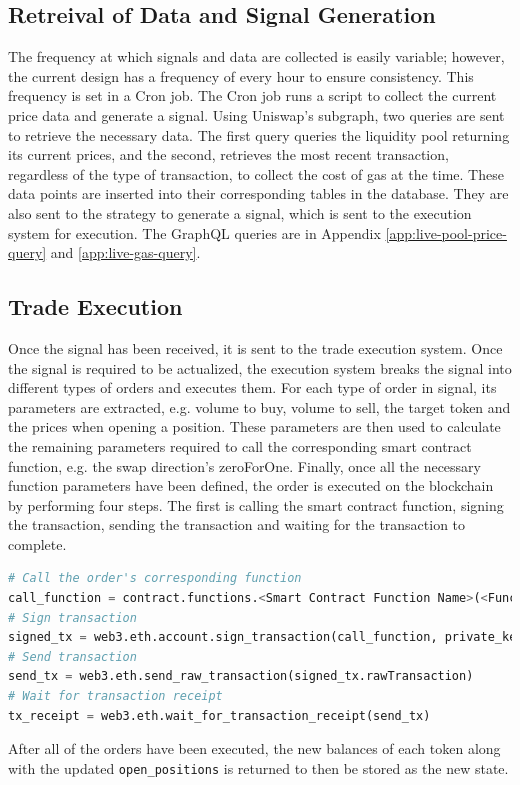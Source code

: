 \subsection{Retreival of Data and Signal Generation}
The frequency at which signals and data are collected is easily variable; however, the current design has a frequency of every hour to ensure consistency. This frequency is set in a Cron job. The Cron job runs a script to collect the current price data and generate a signal. Using Uniswap's subgraph, two queries are sent to retrieve the necessary data. The first query queries the liquidity pool returning its current prices, and the second, retrieves the most recent transaction, regardless of the type of transaction, to collect the cost of gas at the time. These data points are inserted into their corresponding tables in the database. They are also sent to the strategy to generate a signal, which is sent to the execution system for execution. The GraphQL queries are in Appendix \ref{app:live-pool-price-query} and \ref{app:live-gas-query}.

\subsection{Trade Execution}
Once the signal has been received, it is sent to the trade execution system. Once the signal is required to be actualized, the execution system breaks the signal into different types of orders and executes them. For each type of order in signal, its parameters are extracted, e.g. volume to buy, volume to sell, the target token and the prices when opening a position. These parameters are then used to calculate the remaining parameters required to call the corresponding smart contract function, e.g. the swap direction's zeroForOne. Finally, once all the necessary function parameters have been defined, the order is executed on the blockchain by performing four steps. The first is calling the smart contract function, signing the transaction, sending the transaction and waiting for the transaction to complete.
\begin{lstlisting}[language=Python]
# Call the order's corresponding function
call_function = contract.functions.<Smart Contract Function Name>(<Function Paramters>).buildTransaction({"chainId": Chain_id, "from": caller, "nonce": nonce})
# Sign transaction
signed_tx = web3.eth.account.sign_transaction(call_function, private_key=private_key)
# Send transaction
send_tx = web3.eth.send_raw_transaction(signed_tx.rawTransaction)
# Wait for transaction receipt
tx_receipt = web3.eth.wait_for_transaction_receipt(send_tx)
\end{lstlisting}

\noindent After all of the orders have been executed, the new balances of each token along with the updated \texttt{open\_positions} is returned to then be stored as the new state.
